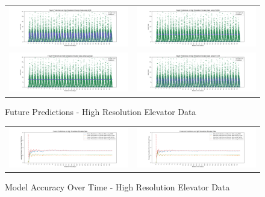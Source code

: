 \begin{figure}
  \begin{tabular}{cc}
    {\includegraphics[width = 3in]{images/results/Future_high_res_elevator_DMM.png}} &
    {\includegraphics[width = 3in]{images/results/Future_high_res_elevator_FreMEn.png}} \\
    {\includegraphics[width = 3in]{images/results/Future_high_res_elevator_Gaussian.png}} &
    {\includegraphics[width = 3in]{images/results/Future_high_res_elevator_HyT-EM.png}} \\
  \end{tabular}
  \caption{Future Predictions - High Resolution Elevator Data}
  \label{figure:Future_Predictions_-_High_Resolution_Elevator_Data}
\end{figure}

\begin{figure}
  \begin{tabular}{cc}
    {\includegraphics[width = 3in]{images/results/Future_Predictions_on_High_Resolution_Elevator_Data.png}} &
    {\includegraphics[width = 3in]{images/results/Historical_Predictions_on_High_Resolution_Elevator_Data.png}} \\
  \end{tabular}
  \caption{Model Accuracy Over Time - High Resolution Elevator Data}
  \label{figure:Model_Accuracy_Over_Time_-_High_Resolution_Elevator_Data}
\end{figure}


